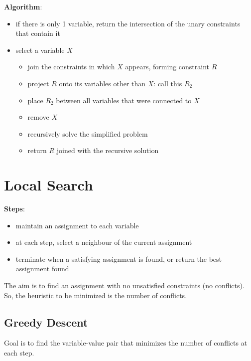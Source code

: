 \documentclass[11pt]{article}
\begin{document}
\textbf{Algorithm}:
\begin{itemize}
\item if there is only 1 variable, return the intersection of the unary constraints that contain it
\item select a variable \(X\)
\begin{itemize}
\item join the constraints in which \(X\) appears, forming constraint \(R\)
\item project \(R\) onto its variables other than \(X\): call this \(R_{2}\)
\item place \(R_{2}\) between all variables that were connected to \(X\)
\item remove \(X\)
\item recursively solve the simplified problem
\item return \(R\) joined with the recursive solution
\end{itemize}
\end{itemize}
\section{Local Search}
\label{sec:org34863a2}
\textbf{Steps}:
\begin{itemize}
\item maintain an assignment to each variable
\item at each step, select a neighbour of the current assignment
\item terminate when a satisfying assignment is found, or return the best assignment found
\end{itemize}

The aim is to find an assignment with no unsatisfied constraints (no conflicts).
So, the heuristic to be minimized is the number of conflicts.
\subsection{Greedy Descent}
\label{sec:orgc76eb00}
Goal is to find the variable-value pair that minimizes the number of conflicts at each step.
\end{document}
